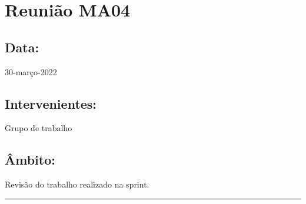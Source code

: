 \section{Reunião MA04}\label{reuniaoMA04}

\subsection*{Data:}
30-março-2022

\subsection*{Intervenientes:}
Grupo de trabalho

\subsection*{Âmbito:}
Revisão do trabalho realizado na sprint.

\noindent \rule{\linewidth}{0.4pt}
\newline
